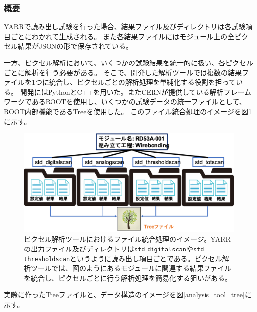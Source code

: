 \subsubsection{概要}
YARRで読み出し試験を行った場合、結果ファイル及びディレクトリは各試験項目ごとにわかれて生成される。
また各結果ファイルにはモジュール上の全ピクセル結果がJSONの形で保存されている。

一方、ピクセル解析において、いくつかの試験結果を統一的に扱い、各ピクセルごとに解析を行う必要がある。
そこで、開発した解析ツールでは複数の結果ファイルを1つに統合し、ピクセルごとの解析処理を単純化する役割を担っている。
開発にはPythonとC++を用いた。またCERNが提供している解析フレームワークであるROOT\cite{4-5}を使用し、いくつかの試験データの統一ファイルとして、ROOT内部機能であるTreeを使用した。
このファイル統合処理のイメージを図\ref{analysis_tool_motivation}に示す。

\begin{figure}[bpt]\centering
\includegraphics[width=12cm]{./analysis_tool_motivation.png}
\caption[ピクセル解析ツールにおけるファイル統合処理のイメージ]{ピクセル解析ツールにおけるファイル統合処理のイメージ。YARRの出力ファイル及びディレクトリは\texttt{std$\_$digitalscan}や\texttt{std$\_$thresholdscan}というように読み出し項目ごとである。ピクセル解析ツールでは、図のようにあるモジュールに関連する結果ファイルを統合し、ピクセルごとに行う解析処理を簡易化する狙いがある。}
\label{analysis_tool_motivation}
\end{figure}

実際に作ったTreeファイルと、データ構造のイメージを図\ref{analysis_tool_tree}に示す。

